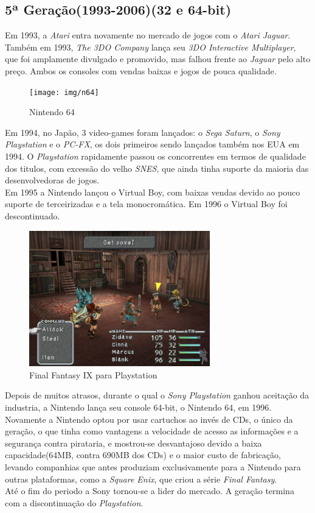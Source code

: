 \documentclass[paper=a4, fontsize=11pt]{scrartcl}	%
\numberwithin{equation}{section}															%
\numberwithin{figure}{section}																%
\numberwithin{table}{section}																%
\begin{document}
\subsection{5ª Geração(1993-2006)(32 e 64-bit)}
Em 1993, a \textit{Atari} entra novamente no mercado de jogos com o \textit{Atari Jaguar}. Também em 1993, \textit{The 3DO Company} lança seu \textit{3DO Interactive Multiplayer}, que foi amplamente divulgado e promovido, mas falhou frente ao \textit{Jaguar} pelo alto preço. Ambos os consoles com vendas baixas e jogos de pouca qualidade. \\
\begin{figure}[h!]
	\centering
    \texttt{[image: img/n64]}
    \caption{Nintendo 64}
\end{figure}
Em 1994, no Japão, 3 video-games foram lançados: o \textit{Sega Saturn}, o \textit{Sony Playstation} e o \textit{PC-FX}, os dois primeiros sendo lançados também nos EUA em 1994. O \textit{Playstation} rapidamente passou os concorrentes em termos de qualidade dos titulos, com excessão do velho \textit{SNES}, que ainda tinha suporte da maioria das desenvolvedoras de jogos. \\
Em 1995 a Nintendo lançou o Virtual Boy, com baixas vendas devido ao pouco suporte de terceirizadas e a tela monocromática. Em 1996 o Virtual Boy foi descontinuado.\\
\begin{figure}[h!]
	\centering
    \includegraphics[width=0.7\textwidth]{img/ff9}
    \caption{Final Fantasy IX para Playstation}
\end{figure}
Depois de muitos atrasos, durante o qual o \textit{Sony Playstation} ganhou aceitação da industria, a Nintendo lança seu console 64-bit, o Nintendo 64, em 1996. Novamente a Nintendo optou por usar cartuchos ao invés de CDs, o único da geração, o que tinha como vantagens a velocidade de acesso as informações e a segurança contra pirataria, e mostrou-se desvantajoso devido a baixa capacidade(64MB, contra 690MB dos CDs) e o maior custo de fabricação, levando companhias que antes produziam exclusivamente para a Nintendo para outras plataformas, como a \textit{Square Enix}, que criou a série \textit{Final Fantasy}.\\
Até o fim do periodo a Sony tornou-se a lider do mercado. A geração termina com a discontinuação do \textit{Playstation}.
\end{document}
